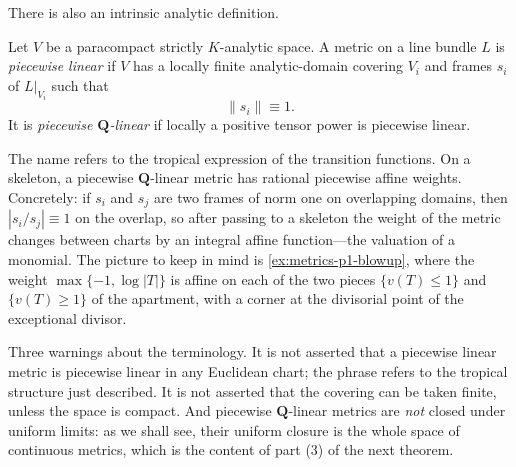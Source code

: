 There is also an intrinsic analytic definition.

\begin{definition}
\label{def:metrics-piecewise-linear}
Let $V$ be a paracompact strictly $K$-analytic space. A metric on a line
bundle $L$ is \emph{piecewise linear} if $V$ has a locally finite
analytic-domain covering $V_i$ and frames $s_i$ of $L|_{V_i}$ such
that
\[
                              \|s_i\|\equiv1.
\]
It is \emph{piecewise $\mathbf Q$-linear} if locally a positive tensor
power is piecewise linear.
\end{definition}

The name refers to the tropical expression of the transition functions. On
a skeleton, a piecewise $\mathbf Q$-linear metric has rational piecewise
affine weights. Concretely: if $s_i$ and $s_j$ are two frames of norm
one on overlapping domains, then $|s_i/s_j|\equiv1$ on the overlap, so
after passing to a skeleton the weight of the metric changes between charts
by an integral affine function---the valuation of a monomial. The picture to
keep in mind is \cref{ex:metrics-p1-blowup}, where the weight
$\max\{-1,\log|T|\}$ is affine on each of the two pieces
$\{v(T)\le1\}$ and $\{v(T)\ge1\}$ of the apartment, with a corner at the
divisorial point of the exceptional divisor.

Three warnings about the terminology. It is not asserted that a piecewise
linear metric is piecewise linear in any Euclidean chart; the phrase refers
to the tropical structure just described. It is not asserted that the
covering can be taken finite, unless the space is compact. And piecewise
$\mathbf Q$-linear metrics are \emph{not} closed under uniform limits: as
we shall see, their uniform closure is the whole space of continuous
metrics, which is the content of part (3) of the next theorem.

